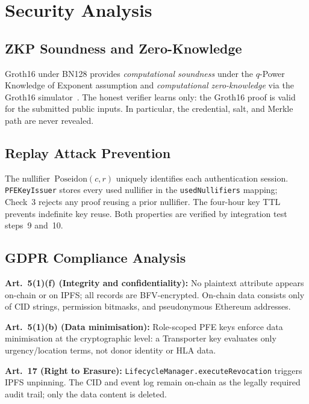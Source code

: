 \documentclass[10pt,twocolumn,a4paper]{article}
\begin{document}
\section{Security Analysis}
\label{sec:security}

\subsection{ZKP Soundness and Zero-Knowledge}

Groth16 under BN128 provides \emph{computational soundness} under the
$q$-Power Knowledge of Exponent assumption and \emph{computational zero-knowledge}
via the Groth16 simulator~\cite{groth16}. The honest verifier learns only: the
Groth16 proof is valid for the submitted public inputs. In particular, the credential,
salt, and Merkle path are never revealed.

\subsection{Replay Attack Prevention}

The nullifier~$\mathrm{Poseidon}(c, r)$ uniquely identifies each authentication
session. \texttt{PFEKeyIssuer} stores every used nullifier in the
\texttt{usedNullifiers} mapping; Check~3 rejects any proof reusing a prior nullifier.
The four-hour key TTL prevents indefinite key reuse. Both properties are verified by
integration test steps~9 and~10.

\subsection{GDPR Compliance Analysis}

\textbf{Art.~5(1)(f) (Integrity and confidentiality):} No plaintext attribute appears
on-chain or on IPFS; all records are BFV-encrypted. On-chain data consists only of
CID strings, permission bitmasks, and pseudonymous Ethereum addresses.

\textbf{Art.~5(1)(b) (Data minimisation):} Role-scoped PFE keys enforce data
minimisation at the cryptographic level: a Transporter key evaluates only
urgency/location terms, not donor identity or HLA data.

\textbf{Art.~17 (Right to Erasure):} \texttt{LifecycleManager.executeRevocation}
triggers IPFS unpinning. The CID and event log remain on-chain as the legally required
audit trail; only the data content is deleted.
\end{document}
